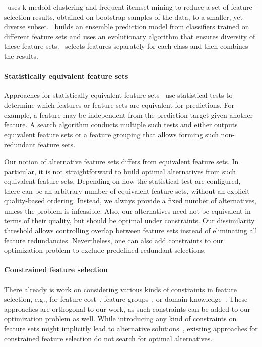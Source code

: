 \documentclass{article}
\theoremstyle{definition}
\begin{document}
\cite{woznica2012model}~uses k-medoid clustering and frequent-itemset mining to reduce a set of feature-selection results, obtained on bootstrap samples of the data, to a smaller, yet diverse subset.
\cite{liu2019subspace}~builds an ensemble prediction model from classifiers trained on different feature sets and uses an evolutionary algorithm that ensures diversity of these feature sets.
\cite{guru2018alternative}~selects features separately for each class and then combines the results.

\paragraph{Statistically equivalent feature sets}

Approaches for statistically equivalent feature sets~\cite{borboudakis2021extending, lagani2017feature} use statistical tests to determine which features or feature sets are equivalent for predictions.
For example, a feature may be independent from the prediction target given another feature.
A search algorithm conducts multiple such tests and either outputs equivalent feature sets or a feature grouping that allows forming such non-redundant feature sets.

Our notion of alternative feature sets differs from equivalent feature sets.
In particular, it is not straightforward to build optimal alternatives from such equivalent feature sets.
Depending on how the statistical test are configured, there can be an arbitrary number of equivalent feature sets, without an explicit quality-based ordering.
Instead, we always provide a fixed number of alternatives, unless the problem is infeasible.
Also, our alternatives need not be equivalent in terms of their quality, but should be optimal under constraints.
Our dissimilarity threshold allows controlling overlap between feature sets instead of eliminating all feature redundancies.
Nevertheless, one can also add constraints to our optimization problem to exclude predefined redundant selections.

\paragraph{Constrained feature selection}

There already is work on considering various kinds of constraints in feature selection, e.g., for feature cost~\cite{paclik2002feature}, feature groups~\cite{yuan2006model}, or domain knowledge~\cite{bach2022empirical, groves2015toward}.
These approaches are orthogonal to our work, as such constraints can be added to our optimization problem as well.
While introducing any kind of constraints on feature sets might implicitly lead to alternative solutions~\cite{bach2022empirical}, existing approaches for constrained feature selection do not search for optimal alternatives.
\end{document}
